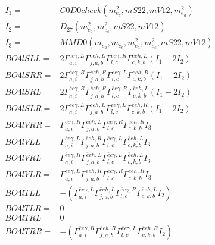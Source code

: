 \documentclass[A4,landscape]{article}
\begin{document}
\begin{align} 
I_1 = & C0D0check(m^2_{e_{{c}}}, mS22, mV12, m^2_{e_{{a}}}) \\ 
I_2 = & D_{27}(m^2_{e_{{a}}}, m^2_{e_{{c}}}, mS22, mV12) \\ 
I_3 = & MMD0(m_{e_{{a}}}, m_{e_{{c}}}, m^2_{e_{{a}}}, m^2_{e_{{c}}}, mS22, mV12) \\ 
  BO4lSLL= & 2  \Gamma^{\bar{e}e \gamma ,L}_{a, i} \Gamma^{\bar{e}e h ,L}_{j, a, b} \Gamma^{\bar{e}e \gamma ,R}_{l, c} \Gamma^{\bar{e}e h ,L}_{c, k, b} (I_1 - 2 I_2) \\ 
  BO4lSRR= & 2  \Gamma^{\bar{e}e \gamma ,R}_{a, i} \Gamma^{\bar{e}e h ,R}_{j, a, b} \Gamma^{\bar{e}e \gamma ,L}_{l, c} \Gamma^{\bar{e}e h ,R}_{c, k, b} (I_1 - 2 I_2) \\ 
  BO4lSRL= & 2  \Gamma^{\bar{e}e \gamma ,R}_{a, i} \Gamma^{\bar{e}e h ,R}_{j, a, b} \Gamma^{\bar{e}e \gamma ,R}_{l, c} \Gamma^{\bar{e}e h ,L}_{c, k, b} (I_1 - 2 I_2) \\ 
  BO4lSLR= & 2  \Gamma^{\bar{e}e \gamma ,L}_{a, i} \Gamma^{\bar{e}e h ,L}_{j, a, b} \Gamma^{\bar{e}e \gamma ,L}_{l, c} \Gamma^{\bar{e}e h ,R}_{c, k, b} (I_1 - 2 I_2) \\ 
  BO4lVRR= &  \Gamma^{\bar{e}e \gamma ,R}_{a, i} \Gamma^{\bar{e}e h ,L}_{j, a, b} \Gamma^{\bar{e}e \gamma ,R}_{l, c} \Gamma^{\bar{e}e h ,R}_{c, k, b} I_3 \\ 
  BO4lVLL= &  \Gamma^{\bar{e}e \gamma ,L}_{a, i} \Gamma^{\bar{e}e h ,R}_{j, a, b} \Gamma^{\bar{e}e \gamma ,L}_{l, c} \Gamma^{\bar{e}e h ,L}_{c, k, b} I_3 \\ 
  BO4lVRL= &  \Gamma^{\bar{e}e \gamma ,R}_{a, i} \Gamma^{\bar{e}e h ,L}_{j, a, b} \Gamma^{\bar{e}e \gamma ,L}_{l, c} \Gamma^{\bar{e}e h ,L}_{c, k, b} I_3 \\ 
  BO4lVLR= &  \Gamma^{\bar{e}e \gamma ,L}_{a, i} \Gamma^{\bar{e}e h ,R}_{j, a, b} \Gamma^{\bar{e}e \gamma ,R}_{l, c} \Gamma^{\bar{e}e h ,R}_{c, k, b} I_3 \\ 
  BO4lTLL= & -( \Gamma^{\bar{e}e \gamma ,L}_{a, i} \Gamma^{\bar{e}e h ,L}_{j, a, b} \Gamma^{\bar{e}e \gamma ,R}_{l, c} \Gamma^{\bar{e}e h ,L}_{c, k, b} I_2) \\ 
  BO4lTLR= & 0 \\ 
  BO4lTRL= & 0 \\ 
  BO4lTRR= & -( \Gamma^{\bar{e}e \gamma ,R}_{a, i} \Gamma^{\bar{e}e h ,R}_{j, a, b} \Gamma^{\bar{e}e \gamma ,L}_{l, c} \Gamma^{\bar{e}e h ,R}_{c, k, b} I_2) \\ 
\end{align} 
\end{document}
